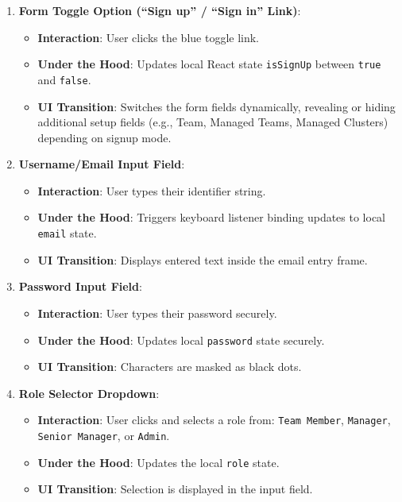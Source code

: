 \documentclass[11pt,a4paper]{article}
\begin{document}
\begin{enumerate}
    \item \textbf{Form Toggle Option (``Sign up'' / ``Sign in'' Link)}:
    \begin{itemize}
        \item \textbf{Interaction}: User clicks the blue toggle link.
        \item \textbf{Under the Hood}: Updates local React state \texttt{isSignUp} between \texttt{true} and \texttt{false}.
        \item \textbf{UI Transition}: Switches the form fields dynamically, revealing or hiding additional setup fields (e.g., Team, Managed Teams, Managed Clusters) depending on signup mode.
    \end{itemize}
    
    \item \textbf{Username/Email Input Field}:
    \begin{itemize}
        \item \textbf{Interaction}: User types their identifier string.
        \item \textbf{Under the Hood}: Triggers keyboard listener binding updates to local \texttt{email} state.
        \item \textbf{UI Transition}: Displays entered text inside the email entry frame.
    \end{itemize}
    
    \item \textbf{Password Input Field}:
    \begin{itemize}
        \item \textbf{Interaction}: User types their password securely.
        \item \textbf{Under the Hood}: Updates local \texttt{password} state securely.
        \item \textbf{UI Transition}: Characters are masked as black dots.
    \end{itemize}
    
    \item \textbf{Role Selector Dropdown}:
    \begin{itemize}
        \item \textbf{Interaction}: User clicks and selects a role from: \texttt{Team Member}, \texttt{Manager}, \texttt{Senior Manager}, or \texttt{Admin}.
        \item \textbf{Under the Hood}: Updates the local \texttt{role} state.
        \item \textbf{UI Transition}: Selection is displayed in the input field.
    \end{itemize}
    

\end{enumerate}
\end{document}
